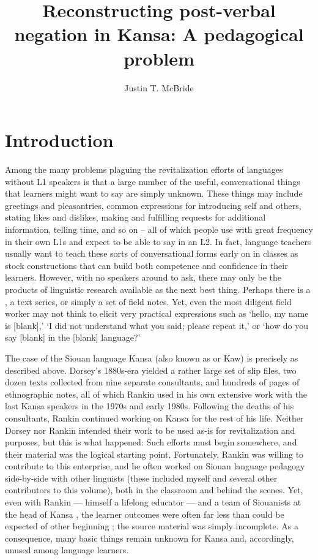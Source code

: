 \documentclass[output=paper]{LSP/langsci}
\author{Justin T. McBride}
\title{Reconstructing post-verbal negation in {Kansa}: {A} pedagogical problem}
\begin{document}
\section{Introduction}
Among the many problems plaguing the revitalization efforts of languages without L1 speakers is that a large number of the useful, conversational things that learners might want to say are simply unknown. These 
things 
may include greetings and pleasantries, common expressions for introducing self and others, stating likes and dislikes, making and fulfilling requests for additional information, telling time, and so on -- all of which people use with great frequency in their own L1s and expect to be able to say in an L2. In fact, language teachers usually want to teach these sorts of conversational forms early on in classes as stock constructions that can build both competence and confidence in their learners. However, with no speakers around to ask, there may only be the products of linguistic research available as the next best thing. Perhaps there is a , a text series, or simply a set of field notes. Yet, even the most diligent field worker may not think to elicit very practical expressions such as `hello, my name is [blank],' `I did not understand what you said; please repeat it,' or `how do you say [blank] in the [blank] language?' 

 
The case of the  Siouan language Kansa (also known as  or Kaw) is precisely as described above. Dorsey's 1880s-era  yielded a rather large set of slip files, two dozen texts collected from nine separate consultants, and hundreds of pages of ethnographic notes, all of which Rankin used in his own extensive work with the last Kansa speakers in the 1970s and early 1980s. Following the deaths of his consultants, Rankin continued working on Kansa for the rest of his life. Neither Dorsey nor Rankin intended their work to be used as-is for revitalization and  purposes, but this is what happened: Such efforts must begin somewhere, and their material was the logical starting point. Fortunately, Rankin was willing to contribute to this enterprise, and he often worked on Siouan language pedagogy side-by-side with other linguists (these included myself and several other contributors to this volume), both in the classroom and behind the scenes. Yet, even with Rankin --- himself a lifelong educator --- and a team of Siouanists at the head of Kansa , the learner outcomes were often far less than could be expected of other beginning ; the source material was simply incomplete. As a consequence, many basic things remain unknown for Kansa and, accordingly, unused among language learners.
 
\end{document}
